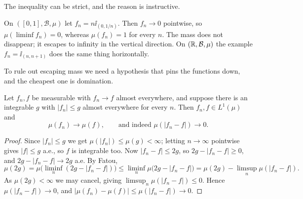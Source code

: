 \documentclass[a4paper]{scrartcl}
\newcommand{\cB}{\mathcal{B}}
\newcommand{\ind}{\ii}
\begin{document}
The inequality can be strict, and the reason is instructive.

\begin{example}\label{pm-ex:bump}
	On $([0,1],\cB,\mu)$ let $f_n = n\ind_{(0,1/n)}$. Then $f_n \to 0$ pointwise, so $\mu(\liminf f_n) = 0$, whereas $\mu(f_n) = 1$ for every $n$. The mass does not disappear; it escapes to infinity in the vertical direction. On $(\R,\cB,\mu)$ the example $f_n = \ind_{(n,n+1)}$ does the same thing horizontally.
\end{example}

\begin{center}
\end{center}

To rule out escaping mass we need a hypothesis that pins the functions down, and the cheapest one is domination.

\begin{theorem}\label{pm-thm:dct}
	Let $f_n, f$ be measurable with $f_n \to f$ almost everywhere, and suppose there is an integrable $g$ with $|f_n| \leq g$ almost everywhere for every $n$. Then $f_n, f \in L^1(\mu)$ and
	$$
	\mu(f_n) \to \mu(f), \qquad \text{and indeed } \mu(|f_n - f|) \to 0.
	$$
\end{theorem}
\begin{proof}
	Since $|f_n| \leq g$ we get $\mu(|f_n|)\leq \mu(g) < \infty$; letting $n\to\infty$ pointwise gives $|f| \leq g$ a.e., so $f$ is integrable too. Now $|f_n - f| \leq 2g$, so $2g - |f_n - f| \geq 0$, and $2g - |f_n-f| \to 2g$ a.e. By Fatou,
	$$
	\mu(2g) = \mu\big(\liminf_n (2g - |f_n - f|)\big) \leq \liminf_n \mu\big(2g - |f_n-f|\big) = \mu(2g) - \limsup_n \mu(|f_n-f|).
	$$
	As $\mu(2g) < \infty$ we may cancel, giving $\limsup_n \mu(|f_n-f|) \leq 0$. Hence $\mu(|f_n - f|)\to 0$, and $|\mu(f_n)-\mu(f)| \leq \mu(|f_n-f|) \to 0$.
\end{proof}
\end{document}
